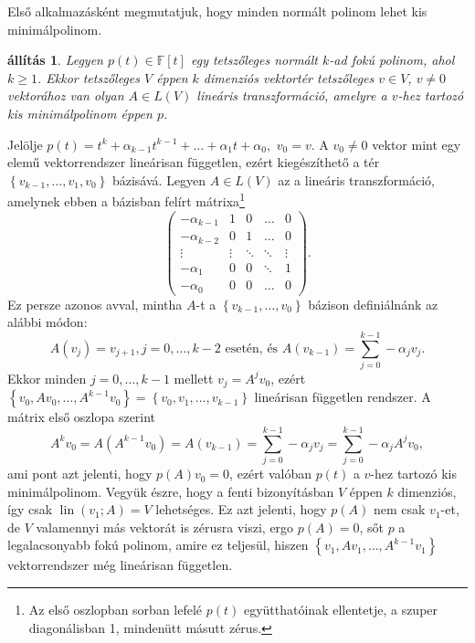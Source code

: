 \documentclass[a4paper, showtrims]{memoir}
\makeatletter
\renewenvironment{proof}[1][\proofname]
    {\par\pushQED{\qed}%
    \normalfont \topsep6\p@\@plus6\p@\relax
    \trivlist
    \item[\hskip\labelsep
        \itshape
    #1\@addpunct{:}]\ignorespaces}
    {\popQED\endtrivlist\@endpefalse}
\theoremstyle{plain}
\newtheorem{proposition}{állítás}[chapter]
\theoremstyle{remark}
\theoremstyle{definition}
\DeclareMathOperator{\lin}{lin}
\makeatother
\begin{document}
Első alkalmazásként megmutatjuk, hogy minden normált polinom lehet kis minimálpolinom.
\begin{proposition}\label{pr:polinom-kis-minimalpolinom}
    Legyen $p\left( t \right)\in\mathbb{F}\left[ t \right]$ egy tetszőleges normált $k$-ad fokú polinom, ahol $k\geq 1$.
    Ekkor tetszőleges $V$ éppen $k$ dimenziós vektortér tetszőleges $v\in V$, $v\neq 0$ vektorához van olyan $A\in L\left( V \right)$
    lineáris transzformáció, amelyre a $v$-hez tartozó kis minimálpolinom éppen $p$.
\end{proposition}
\begin{proof}
    Jelölje 
    \(
    p\left( t \right)=t^k+\alpha_{k-1}t^{k-1}+\dots+\alpha_1t+\alpha_0,
    \)
    $v_0=v.$ 
    A $v_0\neq 0$ vektor mint egy elemű vektorrendszer lineárisan független, ezért kiegészíthető a tér
    $\left\{ v_{k-1},\ldots,v_1,v_0 \right\}$ bázisává.
    Legyen $A\in L\left( V \right)$ az a lineáris transzformáció, 
    amelynek ebben a bázisban felírt mátrixa\footnote{Az első oszlopban sorban lefelé $p\left( t \right)$ együtthatóinak ellentetje, a szuper diagonálisban 1, mindenütt másutt zérus.}
    \[
        \begin{pmatrix}
            -\alpha_{k-1}&1&0&\dots&0\\
            -\alpha_{k-2}&0&1&\dots&0\\
            \vdots       &\vdots &\ddots & \ddots    &\vdots\\
            -\alpha_1    &0&0&\ddots&1\\
            -\alpha_0    &0&0&\dots&0
        \end{pmatrix}.
    \]
    Ez persze azonos avval, mintha $A$-t a $\left\{ v_{k-1},\ldots,v_0 \right\}$
    bázison definiálnánk az alábbi módon:
    \[
        A\left( v_j \right)=v_{j+1}, j=0,\ldots,k-2\mbox{ esetén, és } 
        A\left( v_{k-1} \right)=\sum_{j=0}^{k-1}-\alpha_jv_j.
    \]
    Ekkor minden $j=0,\ldots,k-1$ mellett $v_j=A^jv_0$, 
    ezért $\left\{ v_0,Av_0,\ldots,A^{k-1}v_0 \right\}=\left\{ v_0,v_1,\ldots,v_{k-1} \right\}$ lineárisan független rendszer.
    A mátrix első oszlopa szerint 
    \[
        A^kv_0=
        A\left( A^{k-1}v_0 \right)=
        A\left( v_{k-1} \right)=
        \sum_{j=0}^{k-1}-\alpha_jv_{j}=
        \sum_{j=0}^{k-1}-\alpha_jA^jv_0,
    \]
    ami pont azt jelenti, hogy $p(A)v_0=0$, 
    ezért valóban $p\left( t \right)$ a $v$-hez tartozó kis minimálpolinom.
\end{proof}
Vegyük észre, hogy a fenti bizonyításban
$V$ éppen $k$ dimenziós, így csak $\lin\left( v_1;A \right)=V$ lehetséges.
Ez azt jelenti, hogy $p\left( A \right)$ nem csak $v_1$-et, de $V$ valamennyi más vektorát is zérusra viszi,
ergo $p\left( A \right)=0$, sőt $p$ a legalacsonyabb fokú polinom, amire ez teljesül,
hiszen $\left\{ v_1,Av_1,\ldots,A^{k-1}v_1 \right\}$ vektorrendszer még lineárisan független.
\end{document}
